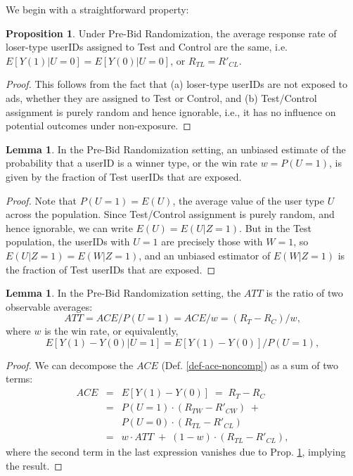 \documentclass[11pt,a4paper]{article}
\theoremstyle{definition}
\theoremstyle{remark}
\theoremstyle{definition}
\theoremstyle{definition}
\theoremstyle{definition}
\theoremstyle{definition}
\theoremstyle{definition}
\theoremstyle{definition}
\newtheorem{lemma}[theorem]{Lemma}
\newtheorem{proposition}[theorem]{Proposition}
\begin{document}
We begin with a straightforward property:
\begin{proposition} \label{prop-rtl-rcl}\small
Under Pre-Bid Randomization, the average response rate of loser-type userIDs assigned to Test and Control are the same, i.e. $E[Y(1) | U=0] = E[Y(0) | U=0]$, or $R_{TL} = R'_{CL}$.
\begin{proof}
This follows from the fact that (a) loser-type userIDs are not exposed to ads, whether they are assigned to Test or Control, and (b) Test/Control assignment is purely random and hence ignorable, i.e., it has no influence on potential outcomes under non-exposure.
\end{proof}


\end{proposition}

\begin{lemma}\small
In the Pre-Bid Randomization setting, an unbiased estimate of the probability that a userID is a winner type, or the win rate $w = P(U=1)$, is given by the fraction of Test userIDs that are exposed. 
\begin{proof}\small
Note that $P(U=1) = E(U)$, the average value of the user type $U$ across the population. Since Test/Control assignment is purely random, and hence ignorable, we can write $E(U) = E(U | Z=1)$. But in the Test population, the userIDs with $U=1$ are precisely those with $W=1$, so $E(U|Z=1) = E(W|Z=1)$, and an unbiased estimator of $E(W|Z=1)$ is the fraction of Test userIDs that are exposed.
\end{proof}
\end{lemma}

\begin{lemma} \label{lem-att-prebid}\small
	In the Pre-Bid Randomization setting, the $ATT$ is the ratio of two observable averages:
\begin{equation}
ATT = ACE/P(U=1) = ACE/w = (R_T - R_C)/w, 	\label{eq-att-prebid}
\end{equation}
where $w$ is the win rate, or equivalently, 
\begin{equation}
E[Y(1) - Y(0) | U=1] = E[Y(1) - Y(0)]/P(U=1), 	\label{eq-att-prebid-expec}
\end{equation}


\begin{proof}\small
We can decompose the $ACE$ (Def. \ref{def-ace-noncomp}) as a sum of two terms:
\begin{eqnarray}
ACE &= & E[ Y(1) - Y(0) ] \; = \; R_T - R_C \\
	&= & P(U=1)\cdot (R_{TW} - R'_{CW}) \; +\; \\
	&  &  P(U=0)\cdot (R_{TL} - R'_{CL})  \\
    &= & w \cdot ATT \; + \; (1-w) \cdot (R_{TL} - R'_{CL}),
\end{eqnarray}
where the second term in the last expression vanishes due to Prop. \ref{prop-rtl-rcl}, implying the result.
\end{proof}
\end{lemma}
\end{document}
